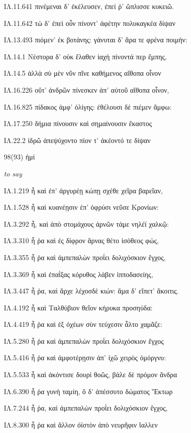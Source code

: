 \begin{enumerate}
{ΙΛ.11.641 πινέμεναι δ' ἐκέλευσεν, ἐπεί ῥ' ὥπλισσε κυκειῶ. 

ΙΛ.11.642 τὼ δ' ἐπεὶ οὖν πίνοντ' ἀφέτην πολυκαγκέα δίψαν 

ΙΛ.13.493 πιόμεν' ἐκ βοτάνης: γάνυται δ' ἄρα τε φρένα ποιμήν: 

ΙΛ.14.1 Νέστορα δ' οὐκ ἔλαθεν ἰαχὴ πίνοντά περ ἔμπης, 

ΙΛ.14.5 ἀλλὰ σὺ μὲν νῦν πῖνε καθήμενος αἴθοπα οἶνον 

ΙΛ.16.226 οὔτ' ἀνδρῶν πίνεσκεν ἀπ' αὐτοῦ αἴθοπα οἶνον, 

ΙΛ.16.825 πίδακος ἀμφ' ὀλίγης: ἐθέλουσι δὲ πιέμεν ἄμφω: 

ΙΛ.17.250 δήμια πίνουσιν καὶ σημαίνουσιν ἕκαστος 

ΙΛ.22.2 ἱδρῶ ἀπεψύχοντο πίον τ' ἀκέοντό τε δίψαν 

}

\clearpage
\item[\large 98(93)]{\large \g ἠμί}

\hspace{0.2cm} \textit{ to say }

{\g
ΙΛ.1.219 ἦ καὶ ἐπ' ἀργυρέῃ κώπῃ σχέθε χεῖρα βαρεῖαν, 

ΙΛ.1.528 ἦ καὶ κυανέῃσιν ἐπ' ὀφρύσι νεῦσε Κρονίων: 

ΙΛ.3.292 ἦ, καὶ ἀπὸ στομάχους ἀρνῶν τάμε νηλέϊ χαλκῷ: 

ΙΛ.3.310 ἦ ῥα καὶ ἐς δίφρον ἄρνας θέτο ἰσόθεος φώς, 

ΙΛ.3.355 ἦ ῥα καὶ ἀμπεπαλὼν προΐει δολιχόσκιον ἔγχος, 

ΙΛ.3.369 ἦ καὶ ἐπαΐξας κόρυθος λάβεν ἱπποδασείης, 

ΙΛ.3.447 ἦ ῥα, καὶ ἄρχε λέχοσδὲ κιών: ἅμα δ' εἵπετ' ἄκοιτις. 

ΙΛ.4.192 ἦ καὶ Ταλθύβιον θεῖον κήρυκα προσηύδα: 

ΙΛ.4.419 ἦ ῥα καὶ ἐξ ὀχέων σὺν τεύχεσιν ἆλτο χαμᾶζε: 

ΙΛ.5.280 ἦ ῥα καὶ ἀμπεπαλὼν προΐει δολιχόσκιον ἔγχος 

ΙΛ.5.416 ἦ ῥα καὶ ἀμφοτέρῃσιν ἀπ' ἰχῶ χειρὸς ὀμόργνυ: 

ΙΛ.5.533 ἦ καὶ ἀκόντισε δουρὶ θοῶς, βάλε δὲ πρόμον ἄνδρα 

ΙΛ.6.390 ἦ ῥα γυνὴ ταμίη, ὃ δ' ἀπέσσυτο δώματος Ἕκτωρ 

ΙΛ.7.244 ἦ ῥα, καὶ ἀμπεπαλὼν προΐει δολιχόσκιον ἔγχος, 

ΙΛ.8.300 ἦ ῥα καὶ ἄλλον ὀϊστὸν ἀπὸ νευρῆφιν ἴαλλεν 

}
\end{enumerate}
